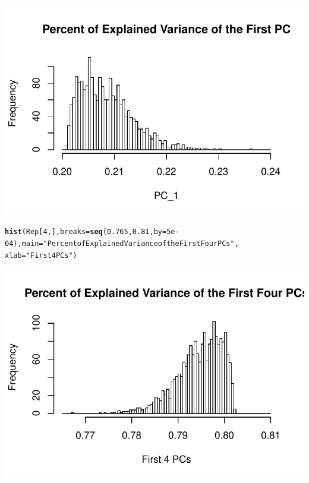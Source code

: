 \documentclass{article}\usepackage[]{graphicx}\usepackage[]{color}
\makeatletter
\def\maxwidth{ %
  \ifdim\Gin@nat@width>\linewidth
    \linewidth
  \else
    \Gin@nat@width
  \fi
}
\newcommand{\hlnum}[1]{\textcolor[rgb]{0.686,0.059,0.569}{#1}}%
\newcommand{\hlstr}[1]{\textcolor[rgb]{0.192,0.494,0.8}{#1}}%
\newcommand{\hlstd}[1]{\textcolor[rgb]{0.345,0.345,0.345}{#1}}%
\newcommand{\hlkwc}[1]{\textcolor[rgb]{0.333,0.667,0.333}{#1}}%
\newcommand{\hlkwd}[1]{\textcolor[rgb]{0.737,0.353,0.396}{\textbf{#1}}}%
\newenvironment{kframe}{%
 \def\at@end@of@kframe{}%
 \ifinner\ifhmode%
  \def\at@end@of@kframe{\end{minipage}}%
  \begin{minipage}{\columnwidth}%
 \fi\fi%
 \def\FrameCommand##1{\hskip\@totalleftmargin \hskip-\fboxsep
 \colorbox{shadecolor}{##1}\hskip-\fboxsep
     \hskip-\linewidth \hskip-\@totalleftmargin \hskip\columnwidth}%
 \MakeFramed {\advance\hsize-\width
   \@totalleftmargin\z@ \linewidth\hsize
   \@setminipage}}%
 {\par\unskip\endMakeFramed%
 \at@end@of@kframe}
\newenvironment{knitrout}{}{} %
\makeatother
\begin{document}
\begin{knitrout}
{\centering \includegraphics[width=\maxwidth]{figure/minimal-Problem_61} 

}


\begin{kframe}\begin{alltt}
\hlkwd{hist}\hlstd{(Rep[}\hlnum{4}\hlstd{, ],} \hlkwc{breaks} \hlstd{=} \hlkwd{seq}\hlstd{(}\hlnum{0.765}\hlstd{,} \hlnum{0.81}\hlstd{,} \hlkwc{by} \hlstd{=} \hlnum{5e-04}\hlstd{),} \hlkwc{main} \hlstd{=} \hlstr{"Percent of Explained Variance of the First Four PCs"}\hlstd{,}
    \hlkwc{xlab} \hlstd{=} \hlstr{"First 4 PCs"}\hlstd{)}
\end{alltt}
\end{kframe}

{\centering \includegraphics[width=\maxwidth]{figure/minimal-Problem_62} 

}



\end{knitrout}
\end{document}
